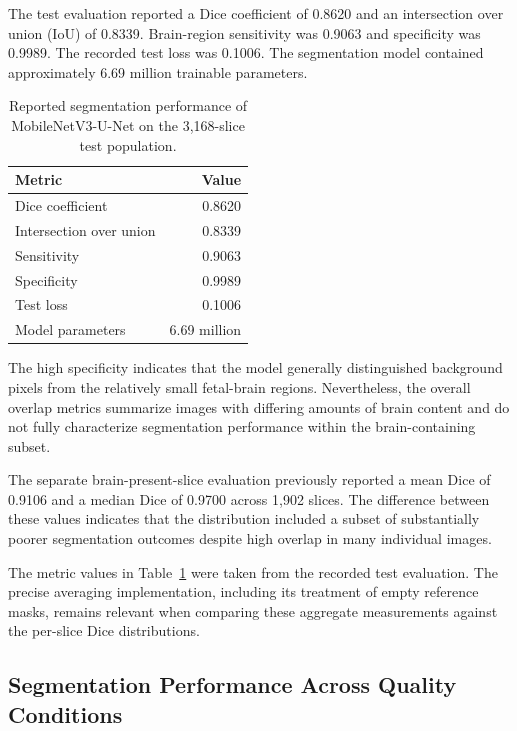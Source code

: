 The test evaluation reported a Dice coefficient of 0.8620 and an intersection over union (IoU) of 0.8339. Brain-region sensitivity was 0.9063 and specificity was 0.9989. The recorded test loss was 0.1006. The segmentation model contained approximately 6.69 million trainable parameters.

\begin{table}[htbp]
\centering
\caption{Reported segmentation performance of MobileNetV3-U-Net on the 3,168-slice test population.}
\label{tab:2d_segmentation_test_metrics}
\begin{tabular}{lr}
\hline
Metric & Value \\
\hline
Dice coefficient & 0.8620 \\
Intersection over union & 0.8339 \\
Sensitivity & 0.9063 \\
Specificity & 0.9989 \\
Test loss & 0.1006 \\
Model parameters & 6.69 million \\
\hline
\end{tabular}
\end{table}

The high specificity indicates that the model generally distinguished background pixels from the relatively small fetal-brain regions. Nevertheless, the overall overlap metrics summarize images with differing amounts of brain content and do not fully characterize segmentation performance within the brain-containing subset.

The separate brain-present-slice evaluation previously reported a mean Dice of 0.9106 and a median Dice of 0.9700 across 1,902 slices. The difference between these values indicates that the distribution included a subset of substantially poorer segmentation outcomes despite high overlap in many individual images.

The metric values in Table~\ref{tab:2d_segmentation_test_metrics} were taken from the recorded test evaluation. The precise averaging implementation, including its treatment of empty reference masks, remains relevant when comparing these aggregate measurements against the per-slice Dice distributions.

\subsection{Segmentation Performance Across Quality Conditions}
\label{subsec:results_2d_segmentation_subgroups}

